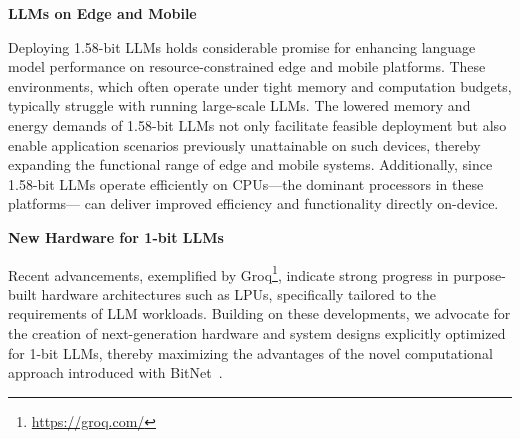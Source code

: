 \textbf{LLMs on Edge and Mobile}

Deploying 1.58-bit LLMs holds considerable promise for enhancing language model performance on resource-constrained edge and mobile platforms. These environments, which often operate under tight memory and computation budgets, typically struggle with running large-scale LLMs. The lowered memory and energy demands of 1.58-bit LLMs not only facilitate feasible deployment but also enable application scenarios previously unattainable on such devices, thereby expanding the functional range of edge and mobile systems. Additionally, since 1.58-bit LLMs operate efficiently on CPUs—the dominant processors in these platforms— can deliver improved efficiency and functionality directly on-device.

\textbf{New Hardware for 1-bit LLMs}

Recent advancements, exemplified by Groq\footnote{\url{https://groq.com/}}, indicate strong progress in purpose-built hardware architectures such as LPUs, specifically tailored to the requirements of LLM workloads. Building on these developments, we advocate for the creation of next-generation hardware and system designs explicitly optimized for 1-bit LLMs, thereby maximizing the advantages of the novel computational approach introduced with BitNet~\cite{bitnet}.

